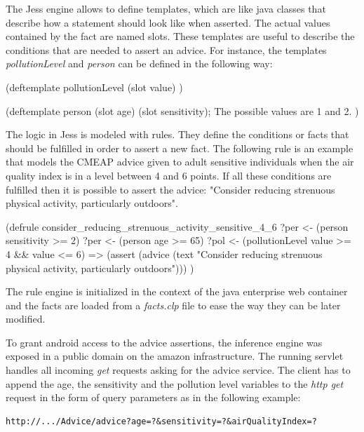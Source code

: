 The Jess engine allows to define templates, which are like java classes that describe how a statement should look like when asserted. The actual values contained by the fact are named slots. These templates are useful to describe the conditions that are needed to assert an advice. For instance, the templates \textit{pollutionLevel} and \textit{person} can be defined in the following way: 

{\centering
\begin{spverbatim}
(deftemplate pollutionLevel
    (slot value)
)

(deftemplate person
    (slot age)
    (slot sensitivity); The possible values are 1 and 2.
)
\end{spverbatim}
\par
}

The logic in Jess is modeled with rules. They define the conditions or facts that should be fulfilled in order to assert a new fact. The following rule is an example that models the CMEAP advice given to adult sensitive individuals when the air quality index is in a level between 4 and 6 points. If all these conditions are fulfilled then it is possible to assert the advice: "Consider reducing strenuous physical activity, particularly outdoors". 

{\centering
\begin{spverbatim}
(defrule consider_reducing_strenuous_activity_sensitive_4_6
    ?per <- (person {sensitivity >= 2})
    ?per <- (person {age >= 65})
    ?pol <- (pollutionLevel {value >= 4 && value <= 6})
    =>
    (assert
        (advice (text "Consider reducing strenuous physical activity, particularly outdoors")))
)
\end{spverbatim}
\par
}

The rule engine is initialized in the context of the java enterprise web container and the facts are loaded from a \textit{facts.clp} file to ease the way they can be later modified. 

To grant android access to the advice assertions, the inference engine was exposed in a public domain on the amazon infrastructure. The running servlet handles all incoming \textit{get} requests asking for the advice service. The client has to append the age, the sensitivity and the pollution level variables to the \textit{http get} request in the form of query parameters as in the following example: \bigskip


{\centering
\begin{BVerbatim}
http://.../Advice/advice?age=?&sensitivity=?&airQualityIndex=?
\end{BVerbatim}
\par
}

